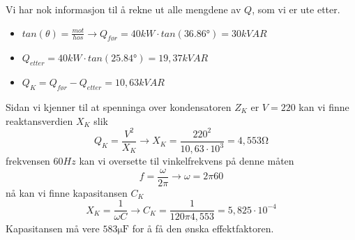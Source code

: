 \documentclass[12pt,a4paper]{article}
\begin{document}
    Vi har nok informasjon til å rekne ut alle mengdene av $Q$, som vi er ute etter.
    \begin{itemize}
      \item $tan(\theta) = \frac{mot}{hos} \rightarrow Q_{før} = 40kW\cdot tan(\ang{36,86})
        = 30kVAR$
      \item $Q_{etter} = 40kW\cdot tan(\ang{25,84}) = 19,37kVAR$
      \item $Q_K = Q_{før} - Q_{etter} = 10,63kVAR$
    \end{itemize}
    Sidan vi kjenner til at spenninga over kondensatoren $Z_K$ er $V=220$ kan vi finne
    reaktansverdien $X_K$ slik
    \begin{equation}
      Q_K = \frac{V^2}{X_K} \rightarrow X_K = \frac{220^2}{10,63\cdot10^3} = 4,553\si{\ohm}
    \end{equation}
    frekvensen $60Hz$ kan vi oversette til vinkelfrekvens på denne måten
    \begin{equation}
      f = \frac{\omega}{2\pi} \rightarrow \omega = 2\pi60
    \end{equation}
    nå kan vi finne kapasitansen $C_K$
    \begin{equation}
      X_K = \frac{1}{\omega C} \rightarrow C_K = \frac{1}{120\pi4,553} = 5,825 \cdot 10^{-4}
    \end{equation}
    Kapasitansen må vere $583 \si{\micro\farad}$ for å få den ønska effektfaktoren.
\end{document}
